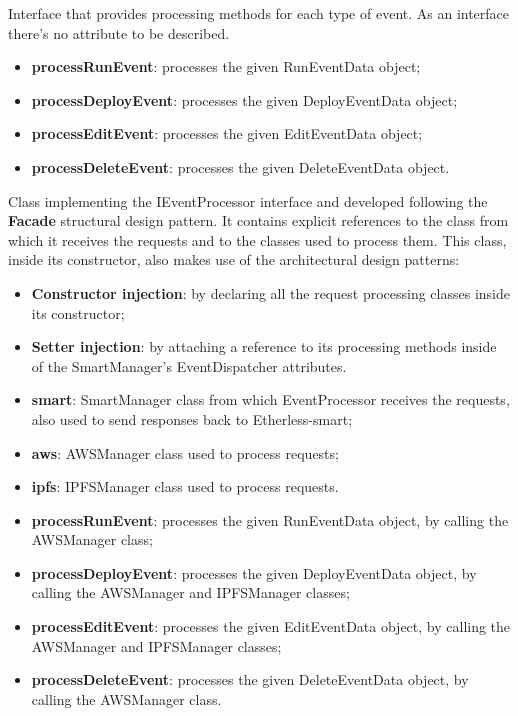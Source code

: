 	Interface that provides processing methods for each type of event.
	As an interface there's no attribute to be described.
	\begin{itemize}
		\item \textbf{processRunEvent}: processes the given RunEventData object;
		\item \textbf{processDeployEvent}: processes the given DeployEventData object;
		\item \textbf{processEditEvent}: processes the given EditEventData object;
		\item \textbf{processDeleteEvent}: processes the given DeleteEventData object.
	\end{itemize}
	Class implementing the IEventProcessor interface and developed following the \textbf{Facade} structural design pattern. It contains explicit references to the class from which it receives the requests and to the classes used to process them. This class, inside its constructor, also makes use of the architectural design patterns: 
	\begin{itemize}
		\item \textbf{Constructor injection}: by declaring all the request processing classes inside its constructor;
		\item \textbf{Setter injection}: by attaching a reference to its processing methods inside of the SmartManager's EventDispatcher attributes.
	\end{itemize} 
	\begin{itemize}
		\item \textbf{smart}: SmartManager class from which EventProcessor receives the requests, also used to send responses back to Etherless-smart;
		\item \textbf{aws}: AWSManager class used to process requests;
		\item \textbf{ipfs}: IPFSManager class used to process requests. 
	\end{itemize}
	\begin{itemize}
		\item \textbf{processRunEvent}: processes the given RunEventData object, by calling the AWSManager class;
		\item \textbf{processDeployEvent}: processes the given DeployEventData object, by calling the AWSManager and IPFSManager classes;
		\item \textbf{processEditEvent}: processes the given EditEventData object, by calling the AWSManager and IPFSManager classes;
		\item \textbf{processDeleteEvent}: processes the given DeleteEventData object, by calling the AWSManager class.
	\end{itemize}
